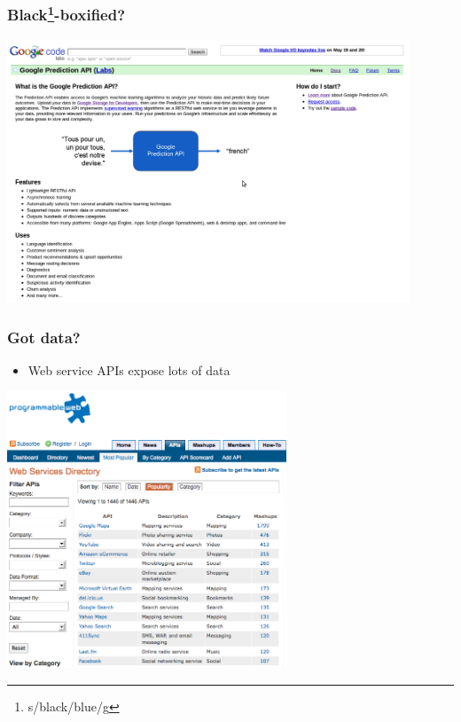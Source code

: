 \documentclass[xcolor=dvipsnames, 9pt]{beamer}
\begin{document}
\begin{frame}[fragile]
    \frametitle{Black\footnote{s/black/blue/g}-boxified?}
    \begin{center}
        \includegraphics[width=0.9\textwidth]{google_pred_api.png}
    \end{center}
\end{frame}


\begin{frame}
  \frametitle{Got data?}

  \begin{itemize}
    \item Web service APIs expose lots of data
  \end{itemize}

    \begin{center}
      \includegraphics[width=0.625\textwidth]{programmableweb.png}
    \end{center}

\end{frame}
\end{document}
